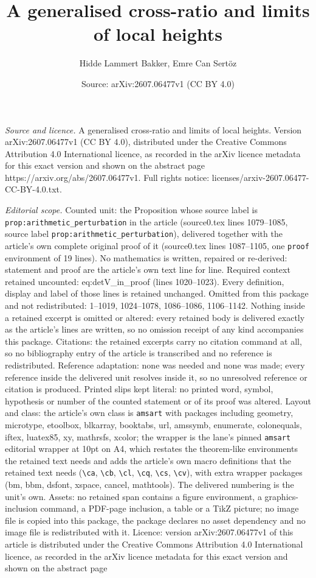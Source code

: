 \documentclass[10pt,a4paper]{amsart}
\title[A generalised cross-ratio and limits of local heights]{A generalised cross-ratio and limits of local heights}
\author{Hidde Lammert Bakker, Emre Can Sert\"oz}
\date{Source: arXiv:2607.06477v1 (CC BY 4.0)}
\begin{document}
\maketitle

\noindent\emph{Source and licence.} A generalised cross-ratio and limits of local heights. Version arXiv:2607.06477v1 (CC BY 4.0), distributed under the Creative Commons Attribution 4.0 International licence, as recorded in the arXiv licence metadata for this exact version and shown on the abstract page https://arxiv.org/abs/2607.06477v1. Full rights notice: licenses/arxiv-2607.06477-CC-BY-4.0.txt.\par\smallskip

\noindent\textit{Editorial scope.} Counted unit: the Proposition whose source label is \texttt{prop:arithmetic\_perturbation} in the article (source0.tex lines 1079--1085, source label \texttt{prop:arithmetic\_perturbation}), delivered together with the article's own complete original proof of it (source0.tex lines 1087--1105, one \texttt{proof} environment of 19 lines). No mathematics is written, repaired or re-derived: statement and proof are the article's own text line for line. Required context retained uncounted: eq:detV\_in\_proof (lines 1020--1023). Every definition, display and label of those lines is retained unchanged. Omitted from this package and not redistributed: 1--1019, 1024--1078, 1086--1086, 1106--1142. Nothing inside a retained excerpt is omitted or altered: every retained body is delivered exactly as the article's lines are written, so no omission receipt of any kind accompanies this package. Citations: the retained excerpts carry no citation command at all, so no bibliography entry of the article is transcribed and no reference is redistributed. Reference adaptation: none was needed and none was made; every reference inside the delivered unit resolves inside it, so no unresolved reference or citation is produced. Printed slips kept literal: no printed word, symbol, hypothesis or number of the counted statement or of its proof was altered. Layout and class: the article's own class is \texttt{amsart} with packages including geometry, microtype, etoolbox, blkarray, booktabs, url, amssymb, enumerate, colonequals, iftex, luatex85, xy, mathrsfs, xcolor; the wrapper is the lane's pinned \texttt{amsart} editorial wrapper at 10pt on A4, which restates the theorem-like environments the retained text needs and adds the article's own macro definitions that the retained text needs (\texttt{\textbackslash ca}, \texttt{\textbackslash cb}, \texttt{\textbackslash cl}, \texttt{\textbackslash cq}, \texttt{\textbackslash cs}, \texttt{\textbackslash cv}), with extra wrapper packages (bm, bbm, dsfont, xspace, cancel, mathtools). The delivered numbering is the unit's own. Assets: no retained span contains a figure environment, a graphics-inclusion command, a PDF-page inclusion, a table or a TikZ picture; no image file is copied into this package, the package declares no asset dependency and no image file is redistributed with it. Licence: version arXiv:2607.06477v1 of this article is distributed under the Creative Commons Attribution 4.0 International licence, as recorded in the arXiv licence metadata for this exact version and shown on the abstract page 
\end{document}
